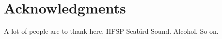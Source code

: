 \documentclass[a4paper,12pt]{article}
\begin{document}
\section*{Acknowledgments}

A lot of people are to thank here. HFSP Seabird Sound. Alcohol. So on. 


\newpage




%
%
%
%
%
%
%
%
%
\end{document}
